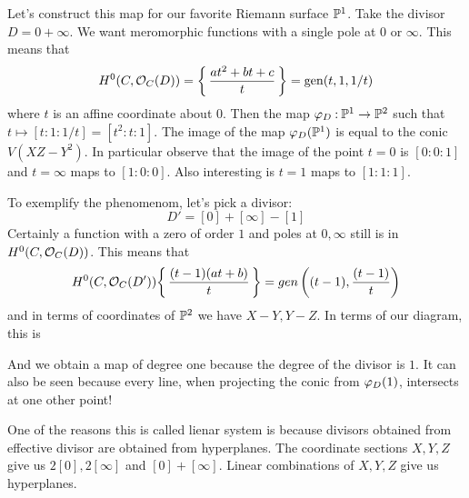\documentclass[12pt]{memoir}
\begin{document}
\begin{Ex}
    Let's construct this map for our favorite Riemann surface $\mathbb{P}^1$. Take the divisor $D=0+\infty$. We want meromorphic functions with a single pole at $0$ or $\infty$. This means that 
    $$H^0(C,\mathcal{O}_C(D))=\biggl\{\,\frac{at^2+bt+c}{t}\,\biggr\}=\operatorname{gen}(t,1,1/t)$$
    where $t$ is an affine coordinate about $0$. Then the map $\varphi_D\mathbin{:}\mathbb{P}^1\to\mathbb{P}^2$ such that $t\mapsto [t:1:1/t]=[t^2:t:1]$. The image of the map $\varphi_D(\mathbb{P}^1)$ is equal to the conic $V(XZ-Y^2)$. In particular observe that the image of the point $t=0$ is $[0:0:1]$ and $t=\infty$ maps to $[1:0:0]$. Also interesting is $t=1$ maps to $[1:1:1]$.\par
    To exemplify the phenomenom, let's pick a divisor:
    $$D'=[0]+[\infty]-[1]$$
    Certainly a function with a zero of order $1$ and poles at $0,\infty$ still is in $H^0(C,\mathcal{O}_C(D))$. This means that 
    $$H^0(C,\mathcal{O}_C(D'))\biggl\{\,\frac{(t-1)(at+b)}{t}\,\biggr\}=gen\left((t-1),\frac{(t-1)}{t}\right)$$
    and in terms of coordinates of $\mathbb{P}^2$ we have $X-Y,Y-Z$. In terms of our diagram, this is
    \begin{center}
    \end{center}
    And we obtain a map of degree one because the degree of the divisor is $1$. It can also be seen because every line, when projecting the conic from $\varphi_D(1)$, intersects at one other point!
\end{Ex}

\begin{Rmk}
    
One of the reasons this is called lienar system is because divisors obtained from effective divisor are obtained from hyperplanes. The coordinate sections $X,Y,Z$ give us $2[0],2[\infty]$ and $[0]+[\infty]$. Linear combinations of $X,Y,Z$ give us hyperplanes. 
\end{Rmk}
\end{document}
